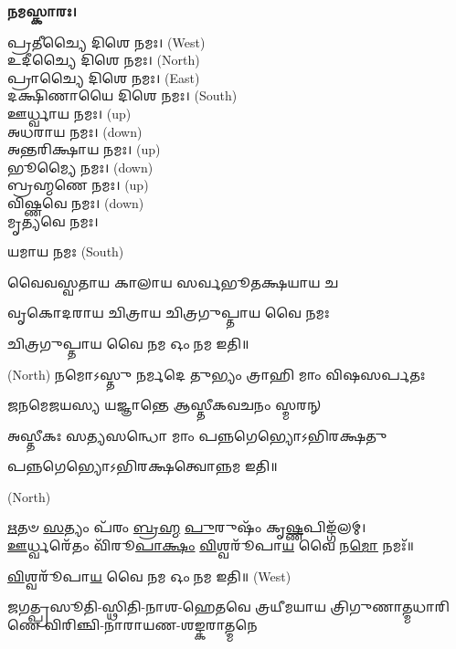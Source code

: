 \textbf{𑌨𑌮𑌸𑍍𑌕𑌾𑌰𑌃।}


𑌪𑍍𑌰𑌤𑍀𑌚𑍍𑌯𑍈 𑌦𑌿𑌶𑍇 𑌨𑌮𑌃।   {\scriptsize (West)}\\
𑌉𑌦𑍀𑌚𑍍𑌯𑍈 𑌦𑌿𑌶𑍇 𑌨𑌮𑌃।   {\scriptsize (North)}\\
𑌪𑍍𑌰𑌾𑌚𑍍𑌯𑍈 𑌦𑌿𑌶𑍇 𑌨𑌮𑌃।   {\scriptsize (East)}\\
𑌦𑌕𑍍𑌷𑌿𑌣𑌾𑌯𑍈 𑌦𑌿𑌶𑍇 𑌨𑌮𑌃।  {\scriptsize (South)}\\
𑌊𑌰𑍍𑌧𑍍𑌵𑌾𑌯 𑌨𑌮𑌃।   {\scriptsize (up)}\\
𑌅𑌧𑌰𑌾𑌯 𑌨𑌮𑌃।   {\scriptsize (down)}\\
𑌅𑌨𑍍𑌤𑌰𑌿𑌕𑍍𑌷𑌾𑌯 𑌨𑌮𑌃। {\scriptsize (up)}\\
𑌭𑍂𑌮𑍍𑌯𑍈 𑌨𑌮𑌃। {\scriptsize (down)}\\
𑌬𑍍𑌰𑌹𑍍𑌮𑌣𑍇 𑌨𑌮𑌃। {\scriptsize (up)}\\
𑌵𑌿𑌷𑍍𑌣𑌵𑍇 𑌨𑌮𑌃।  {\scriptsize (down)}\\
𑌮𑍃𑌤𑍍𑌯𑌵𑍇 𑌨𑌮𑌃।

𑌯𑌮𑌾𑌯 𑌨𑌮𑌃   {\scriptsize (South)}

{𑌵𑍈𑌵𑌸𑍍𑌵𑌤𑌾𑌯   𑌕𑌾𑌲𑌾𑌯   𑌸𑌰𑍍𑌵𑌭𑍂𑌤𑌕𑍍𑌷𑌯𑌾𑌯   𑌚}

{𑌵𑍃𑌕𑍋𑌦𑌰𑌾𑌯   𑌚𑌿𑌤𑍍𑌰𑌾𑌯   𑌚𑌿𑌤𑍍𑌰𑌗𑍁𑌪𑍍𑌤𑌾𑌯   𑌵𑍈  𑌨𑌮𑌃}

𑌚𑌿𑌤𑍍𑌰𑌗𑍁𑌪𑍍𑌤𑌾𑌯   𑌵𑍈  𑌨𑌮 𑌓𑌂 𑌨𑌮 𑌇𑌤𑌿॥

 {\scriptsize (North)}
{𑌨𑌮𑍋𑌽𑌸𑍍𑌤𑍁 𑌨𑌰𑍍𑌮𑌦𑍇 𑌤𑍁𑌭𑍍𑌯𑌂 𑌤𑍍𑌰𑌾𑌹𑌿 𑌮𑌾𑌂 𑌵𑌿𑌷𑌸𑌰𑍍𑌪𑌤𑌃}

{𑌜𑌨𑌮𑍇𑌜𑌯𑌸𑍍𑌯 𑌯𑌜𑍍𑌞𑌾𑌨𑍍𑌤𑍇 𑌆𑌸𑍍𑌤𑍀𑌕𑌵𑌚𑌨𑌂 𑌸𑍍𑌮𑌰𑌨𑍍}


{𑌅𑌸𑍍𑌤𑍀𑌕𑌃 𑌸𑌤𑍍𑌯𑌸𑌨𑍍𑌧𑍋 𑌮𑌾𑌂 𑌪𑌨𑍍𑌨𑌗𑍇𑌭𑍍𑌯𑍋𑌽𑌭𑌿𑌰𑌕𑍍𑌷𑌤𑍁}

𑌪𑌨𑍍𑌨𑌗𑍇𑌭𑍍𑌯𑍋𑌽𑌭𑌿𑌰𑌕𑍍𑌷𑌤𑍍𑌵𑍋𑌨𑍍𑌨𑌮 𑌇𑌤𑌿॥

 {\scriptsize (North)}

\-\ul{𑌋}\-𑌤𑍞 \ul{𑌸}\-𑌤𑍍𑌯𑌂 𑌪᳴𑌰𑌂 \ul{𑌬𑍍𑌰}\-\-\ul{𑌹𑍍𑌮} \ul{𑌪𑍁}\-𑌰𑍁𑌷𑌂᳴ 𑌕𑍃\-\ul{𑌷𑍍𑌣}\-𑌪𑌿𑌙𑍍𑌗᳴𑌲𑌮𑍍।\\
\-\ul{𑌊}\-𑌰𑍍𑌧𑍍𑌵𑌰𑍇᳴𑌤𑌂 𑌵𑌿᳴𑌰𑍂\-\ul{𑌪𑌾}\-\-\ul{𑌕𑍍𑌷𑌂} \ul{𑌵𑌿}\-𑌶𑍍𑌵𑌰𑍂᳴𑌪𑌾\-\ul{𑌯} 𑌵𑍈 𑌨\-\ul{𑌮𑍋} 𑌨𑌮𑌃᳴॥


\-\ul{𑌵𑌿}\-𑌶𑍍𑌵𑌰𑍂᳴𑌪𑌾\-\ul{𑌯} 𑌵𑍈 𑌨𑌮 𑌓𑌂 𑌨𑌮 𑌇𑌤𑌿॥
{\scriptsize (West)}

{𑌜𑌗𑌤𑍍𑌪𑍍𑌰𑌸𑍂𑌤𑌿-𑌸𑍍𑌥𑌿𑌤𑌿-𑌨𑌾𑌶-𑌹𑍇𑌤𑌵𑍇}
{𑌤𑍍𑌰𑌯𑍀𑌮𑌯𑌾𑌯 𑌤𑍍𑌰𑌿𑌗𑍁𑌣𑌾𑌤𑍍𑌮𑌧𑌾𑌰𑌿𑌣𑍇}
{𑌵𑌿𑌰𑌿𑌞𑍍𑌚𑌿-𑌨𑌾𑌰𑌾𑌯𑌣-𑌶𑌙𑍍𑌕𑌰𑌾𑌤𑍍𑌮𑌨𑍇}

